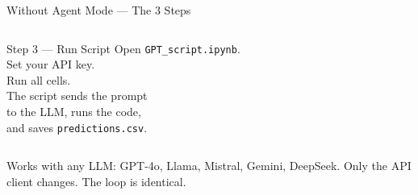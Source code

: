 \documentclass[aspectratio=169,t,10pt]{beamer}
\begin{document}
\begin{frame}{Without Agent Mode --- The 3 Steps}
\begin{columns}[T]
\begin{exampleblock}{\small Step 3 --- Run Script}
\vspace{2pt}
{\scriptsize
Open \texttt{GPT\_script.ipynb}.\\
Set your API key.\\
Run all cells.\\[2pt]
The script sends the prompt\\
to the LLM, runs the code,\\
and saves \texttt{predictions.csv}.
}
\end{exampleblock}
\end{columns}

\vspace{6pt}
\textcolor{GNNgray}{\scriptsize
Works with any LLM: GPT-4o, Llama, Mistral, Gemini, DeepSeek.
Only the API client changes. The loop is identical.}

\end{frame}
\end{document}
